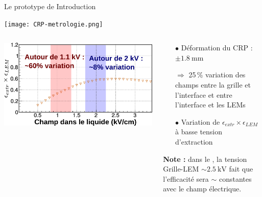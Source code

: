     \begin{frame}{Le prototype de \TOO{}}{Introduction}
        \begin{center} \vspace{-0.5cm}\texttt{[image: CRP-metrologie.png]} \end{center}
        \begin{scriptsize}
            \begin{columns}
                \begin{column}{0.6\textwidth}
                    \centering \includegraphics[width=\textwidth]{./pictures/extr_eff.pdf}
                \end{column}\hfill
                \begin{column}{0.4\textwidth}
                    \begin{itemize}
       					\item[$\bullet$] Déformation du CRP : $\pm\SI{1.8}{\milli\meter}$
       					\item[$\Rightarrow$]  25\,\% variation des champs entre la grille et l'interface et entre l'interface et les LEMs
       					\item[$\bullet$] Variation de $\epsilon_{extr}\times\epsilon_{LEM}$ à basse tension d'extraction
       				\end{itemize}
                     \textbf{Note : } dans le \SSS{}, la tension Grille-LEM $\sim\SI{2.5}{\kilo\volt}$ fait que l'efficacité sera $\sim$ constantes avec le champ électrique.
                \end{column}
            \end{columns}
        \end{scriptsize}
    \end{frame}

